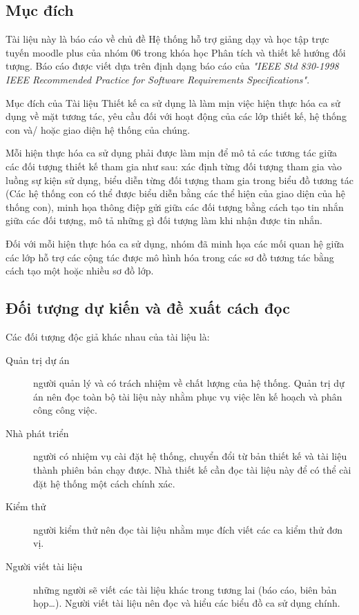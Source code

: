 \documentclass[./../main_file.tex]{subfiles}
\begin{document}
\subsection{Mục đích}

Tài liệu này là báo cáo về chủ đề Hệ thống hỗ trợ giảng dạy và học tập trực tuyến moodle plus của nhóm 06 trong khóa học Phân tích và thiết kế hướng đối tượng.
Báo cáo được viết dựa trên định dạng báo cáo của  \textit{"IEEE Std 830-1998 IEEE Recommended Practice for Software Requirements Specifications"}.


Mục đích của Tài liệu Thiết kế ca sử dụng là làm mịn việc hiện thực hóa ca sử dụng về mặt tương tác, yêu cầu đối với hoạt động của các lớp thiết kế, hệ thống con và/ hoặc giao diện hệ thống của chúng.


Mỗi hiện thực hóa ca sử dụng phải được làm mịn để mô tả các tương tác giữa các đối tượng thiết kế tham gia như sau: xác định từng đối tượng tham gia vào luồng sự kiện sử dụng, biểu diễn từng đối tượng tham gia trong biểu đồ  tương tác (Các hệ thống con có thể được biểu diễn bằng các thể hiện của giao diện của hệ thống con), minh họa thông điệp gửi giữa các đối tượng bằng cách tạo tin nhắn giữa các đối tượng, mô tả những gì đối tượng làm khi nhận được tin nhắn.


Đối với mỗi hiện thực hóa ca sử dụng, nhóm đã minh họa các mối quan hệ giữa các lớp hỗ trợ các cộng tác được mô hình hóa trong các sơ đồ tương tác bằng cách tạo một hoặc nhiều sơ đồ lớp.



\subsection{Đối tượng dự kiến và đề xuất cách đọc}

Các đối tượng độc giả khác nhau của tài liệu là:
\begin{description}
	\item[Quản trị dự án] người quản lý và có trách nhiệm về chất lượng của hệ thống. Quản trị dự án nên đọc toàn bộ tài liệu này nhằm phục vụ việc lên kế hoạch và phân công công việc.
	\item[Nhà phát triển] người có nhiệm vụ cài đặt hệ thống, chuyển đổi từ bản thiết kế và tài liệu thành phiên bản chạy được. Nhà thiết kế cần đọc tài liệu này để có thể cài đặt hệ thống một cách chính xác.
	\item[Kiểm thử] người kiểm thử nên đọc tài liệu nhằm mục đích viết các ca kiểm thử đơn vị.
	\item[Người viết tài liệu] những người sẽ viết các tài liệu khác trong tương lai (báo cáo, biên bản họp…). Người viết tài liệu nên đọc và hiểu các biểu đồ ca sử dụng chính.

\end{description}
\end{document}
